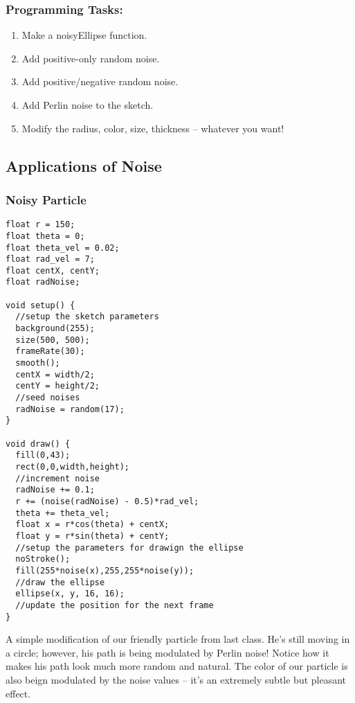 \subsubsection{Programming Tasks:}
\begin{enumerate}
\item Make a noisyEllipse function.
\item Add positive-only random noise.
\item Add positive/negative random noise.
\item Add Perlin noise to the sketch.
\item Modify the radius, color, size, thickness -- whatever you want!
\end{enumerate}



\subsection{Applications of Noise}
\subsubsection{Noisy Particle}
\begin{verbatim}
float r = 150;
float theta = 0;
float theta_vel = 0.02;
float rad_vel = 7;
float centX, centY;
float radNoise;

void setup() {
  //setup the sketch parameters
  background(255);
  size(500, 500);
  frameRate(30);
  smooth();
  centX = width/2;
  centY = height/2;
  //seed noises
  radNoise = random(17);
}

void draw() {
  fill(0,43);
  rect(0,0,width,height);
  //increment noise
  radNoise += 0.1;
  r += (noise(radNoise) - 0.5)*rad_vel;
  theta += theta_vel;
  float x = r*cos(theta) + centX;
  float y = r*sin(theta) + centY;
  //setup the parameters for drawign the ellipse
  noStroke();
  fill(255*noise(x),255,255*noise(y));
  //draw the ellipse
  ellipse(x, y, 16, 16);
  //update the position for the next frame
}
\end{verbatim}

A simple modification of our friendly particle from last class.  He's still moving in a circle; however, his path is being modulated by Perlin noise!  Notice how it makes his path look much more random and natural.  The color of our particle is also beign modulated by the noise values -- it's an extremely subtle but pleasant effect.

